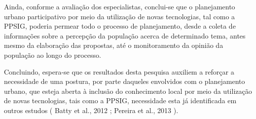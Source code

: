 \documentclass{article}
\begin{document}
Ainda, conforme a avaliação dos especialistas, conclui-se que o planejamento urbano
				participativo por meio da utilização de novas tecnologias, tal como a PPSIG, poderia
				permear todo o processo de planejamento, desde a coleta de informações sobre a
				percepção da população acerca de determinado tema, antes mesmo da elaboração das
				propostas, até o monitoramento da opinião da população ao longo do processo.

Concluindo, espera-se que os resultados desta pesquisa auxiliem a reforçar a
				necessidade de uma postura, por parte daqueles envolvidos com o planejamento urbano,
				que esteja aberta à inclusão do conhecimento local por meio da utilização de novas
				tecnologias, tais como a PPSIG, necessidade esta já identificada em outros estudos
					(%
Batty et al., 2012%
; %
Pereira et al., 2013%
).

\end{document}
